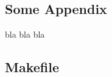 \begin{appendices}
\chapter{Some Appendix}
bla bla bla

    \section{Makefile}
    \label{appendix:makefile}
	

\end{appendices}
